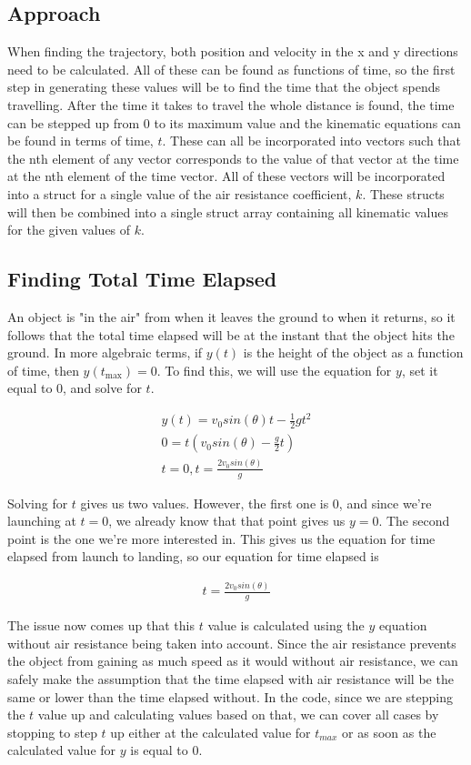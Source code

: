 \documentclass[oneside]{article}
\begin{document}
\subsection{Approach}
When finding the trajectory, both position and velocity in the x and y directions need to be calculated. All of these can be found as functions of time, so the first step in generating these values will be to find the time that the object spends travelling. After the time it takes to travel the whole distance is found, the time can be stepped up from 0 to its maximum value and the kinematic equations can be found in terms of time, $t$. These can all be incorporated into vectors such that the nth element of any vector corresponds to the value of that vector at the time at the nth element of the time vector. All of these vectors will be incorporated into a struct for a single value of the air resistance coefficient, $k$. These structs will then be combined into a single struct array containing all kinematic values for the given values of $k$.

\subsection{Finding Total Time Elapsed}
An object is "in the air" from when it leaves the ground to when it returns, so it follows that the total time elapsed will be at the instant that the object hits the ground. In more algebraic terms, if $y(t)$ is the height of the object as a function of time, then $y(t_\textrm{max}) = 0$. To find this, we will use the equation for $y$, set it equal to 0, and solve for $t$.

\begin{align*}
    y(t) = v_0sin(\theta)t - \frac{1}{2}gt^2\\
    0 = t(v_0sin(\theta) - \frac{g}{2}t)\\
    t = 0, t = \frac{2v_0sin(\theta)}{g}
\end{align*}

Solving for $t$ gives us two values. However, the first one is 0, and since we're launching at $t=0$, we already know that that point gives us $y=0$. The second point is the one we're more interested in. This gives us the equation for time elapsed from launch to landing, so our equation for time elapsed is 

\begin{align}
    t = \frac{2v_0sin(\theta)}{g}
\end{align}

The issue now comes up that this $t$ value is calculated using the $y$ equation without air resistance being taken into account. Since the air resistance prevents the object from gaining as much speed as it would without air resistance, we can safely make the assumption that the time elapsed with air resistance will be the same or lower than the time elapsed without. In the code, since we are stepping the $t$ value up and calculating values based on that, we can cover all cases by stopping to step $t$ up either at the calculated value for $t_{max}$ or as soon as the calculated value for $y$ is equal to 0. 
\end{document}
